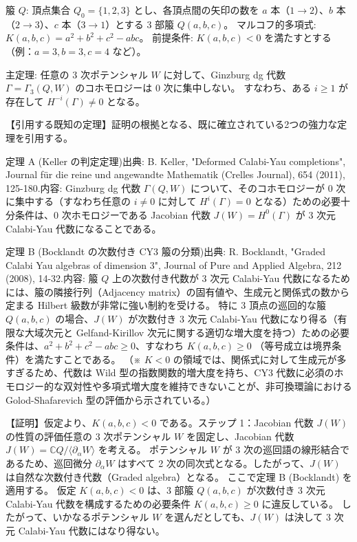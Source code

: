 \documentclass[uplatex,12pt,dvipdfmx]{jsarticle}
\theoremstyle{definition}
\numberwithin{equation}{section}
\begin{document}
\begin{myquote}
	箙 $Q$: 頂点集合 $Q_0 = \{1, 2, 3\}$ とし、各頂点間の矢印の数を $a$ 本（$1 \to 2$）、$b$ 本（$2 \to 3$）、$c$ 本（$3 \to 1$）とする 3 部箙 $Q(a,b,c)$。
	マルコフ的多項式: $K(a,b,c) = a^2 + b^2 + c^2 - abc$。
	前提条件: $K(a,b,c) < 0$ を満たすとする（例：$a=3, b=3, c=4$ など）。

	主定理: 任意の 3 次ポテンシャル $W$ に対して、Ginzburg dg 代数 $\Gamma = \Gamma_3(Q, W)$ のコホモロジーは 0 次に集中しない。
	すなわち、ある $i \ge 1$ が存在して $H^{-i}(\Gamma) \neq 0$ となる。

【引用する既知の定理】証明の根拠となる、既に確立されている2つの強力な定理を引用する。

	定理 A (Keller の判定定理)出典: \cite{MR2795754} B. Keller, "Deformed Calabi-Yau completions", Journal für die reine und angewandte Mathematik (Crelles Journal), 654 (2011), 125-180.内容: Ginzburg dg 代数 $\Gamma(Q, W)$ について、そのコホモロジーが 0 次に集中する（すなわち任意の $i \neq 0$ に対して $H^i(\Gamma) = 0$ となる）ための必要十分条件は、0 次ホモロジーである Jacobian 代数 $J(W) = H^0(\Gamma)$ が 3 次元 Calabi-Yau 代数になることである。

	定理 B (Bocklandt の次数付き CY3 箙の分類)出典: \cite{MR2355031} R. Bocklandt, "Graded Calabi Yau algebras of dimension 3", Journal of Pure and Applied Algebra, 212 (2008), 14-32.内容: 箙 $Q$ 上の次数付き代数が 3 次元 Calabi-Yau 代数になるためには、箙の隣接行列（Adjacency matrix）の固有値や、生成元と関係式の数から定まる Hilbert 級数が非常に強い制約を受ける。
	特に 3 頂点の巡回的な箙 $Q(a,b,c)$ の場合、$J(W)$ が次数付き 3 次元 Calabi-Yau 代数になり得る（有限な大域次元と Gelfand-Kirillov 次元に関する適切な増大度を持つ）ための必要条件は、$a^2 + b^2 + c^2 - abc \ge 0$、すなわち $K(a,b,c) \ge 0$ （等号成立は境界条件）を満たすことである。
	（※ $K < 0$ の領域では、関係式に対して生成元が多すぎるため、代数は Wild 型の指数関数的増大度を持ち、CY3 代数に必須のホモロジー的な双対性や多項式増大度を維持できないことが、非可換環論における Golod-Shafarevich 型の評価から示されている。）

	【証明】仮定より、$K(a,b,c) < 0$ である。ステップ 1：Jacobian 代数 $J(W)$ の性質の評価任意の 3 次ポテンシャル $W$ を固定し、Jacobian 代数 $J(W) = \mathbb{C}Q / \langle \partial_\alpha W \rangle$ を考える。
	ポテンシャル $W$ が 3 次の巡回語の線形結合であるため、巡回微分 $\partial_\alpha W$ はすべて 2 次の同次式となる。したがって、$J(W)$ は自然な次数付き代数（Graded algebra）となる。
	ここで定理 B (Bocklandt) を適用する。
	仮定 $K(a,b,c) < 0$ は、3 部箙 $Q(a,b,c)$ が次数付き 3 次元 Calabi-Yau 代数を構成するための必要条件 $K(a,b,c) \ge 0$ に違反している。
	したがって、いかなるポテンシャル $W$ を選んだとしても、$J(W)$ は決して 3 次元 Calabi-Yau 代数にはなり得ない。


\end{myquote}
\end{document}
